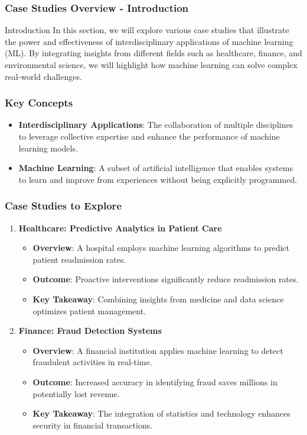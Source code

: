 \documentclass[aspectratio=169]{beamer}
\begin{document}
\begin{frame}[fragile]
    \frametitle{Case Studies Overview - Introduction}
    \begin{block}{Introduction}
        In this section, we will explore various case studies that illustrate the power and effectiveness of interdisciplinary applications of machine learning (ML). 
        By integrating insights from different fields such as healthcare, finance, and environmental science, we will highlight how machine learning can solve complex real-world challenges.
    \end{block}
\end{frame}

\begin{frame}[fragile]
    \frametitle{Key Concepts}
    \begin{itemize}
        \item \textbf{Interdisciplinary Applications}: 
            The collaboration of multiple disciplines to leverage collective expertise and enhance the performance of machine learning models.
        \item \textbf{Machine Learning}: 
            A subset of artificial intelligence that enables systems to learn and improve from experiences without being explicitly programmed.
    \end{itemize}
\end{frame}

\begin{frame}[fragile]
    \frametitle{Case Studies to Explore}
    \begin{enumerate}
        \item \textbf{Healthcare: Predictive Analytics in Patient Care} \\
            \begin{itemize}
                \item \textbf{Overview}: A hospital employs machine learning algorithms to predict patient readmission rates.
                \item \textbf{Outcome}: Proactive interventions significantly reduce readmission rates.
                \item \textbf{Key Takeaway}: Combining insights from medicine and data science optimizes patient management. 
            \end{itemize}
        
        \item \textbf{Finance: Fraud Detection Systems} \\
            \begin{itemize}
                \item \textbf{Overview}: A financial institution applies machine learning to detect fraudulent activities in real-time.
                \item \textbf{Outcome}: Increased accuracy in identifying fraud saves millions in potentially lost revenue. 
                \item \textbf{Key Takeaway}: The integration of statistics and technology enhances security in financial transactions.
            \end{itemize}
    \end{enumerate}
\end{frame}
\end{document}
